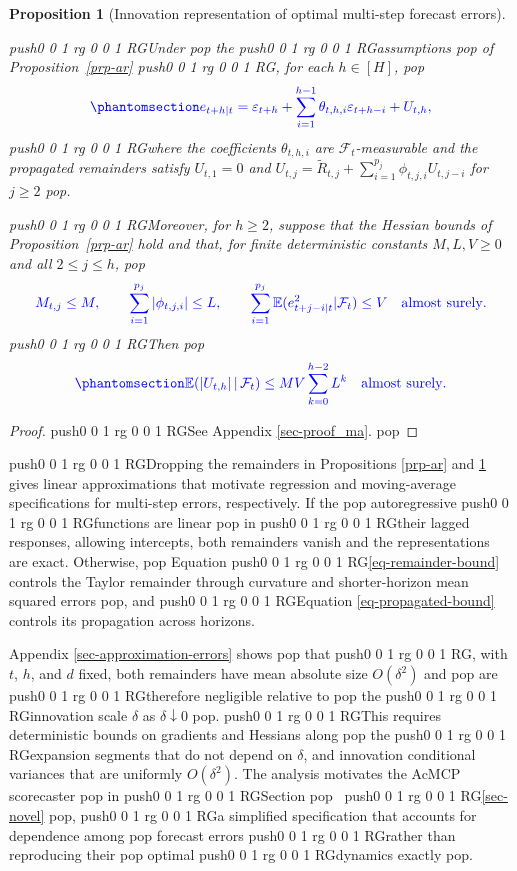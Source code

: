 \documentclass[
  american,
  12pt]{article}
\theoremstyle{plain}
\newtheorem{proposition}{Proposition}[section]
\theoremstyle{plain}
\theoremstyle{remark}
\newcommand{\CPTSadd}[1]{\ifmmode\else\leavevmode\fi\pdfcolorstack 0 push{0 0 1 rg 0 0 1 RG}#1\pdfcolorstack 0 pop}
\begin{document}
\begin{proposition}[Innovation representation of optimal multi-step
forecast errors]\protect\hypertarget{prp-ma}{}\label{prp-ma}

\CPTSadd{Under} the \CPTSadd{assumptions} of Proposition~\ref{prp-ar}\CPTSadd{, for each \(h\in[H]\),}
\begin{equation}\CPTSadd{\phantomsection\label{eq-ma}{
e_{t+h|t}=\varepsilon_{t+h}+
\sum_{i=1}^{h-1}\theta_{t,h,i}\varepsilon_{t+h-i}+U_{t,h},
}}\end{equation} \CPTSadd{where the coefficients \(\theta_{t,h,i}\) are
\(\mathcal F_t\)-measurable and the propagated remainders satisfy
\(U_{t,1}=0\) and
\(U_{t,j}=\widetilde R_{t,j}+\sum_{i=1}^{p_j}\phi_{t,j,i}U_{t,j-i}\) for
\(j\geq2\)}.

\CPTSadd{Moreover, for \(h\geq2\), suppose that the Hessian bounds of
Proposition~\ref{prp-ar} hold and that, for finite deterministic
constants \(M,L,V\geq0\) and all \(2\leq j\leq h\),} \[
\CPTSadd{M_{t,j}\leq M,\qquad
\sum_{i=1}^{p_j}|\phi_{t,j,i}|\leq L,
\qquad \sum_{i=1}^{p_j}\mathbb E(e_{t+j-i|t}^2|\mathcal F_t)\leq V\quad\text{almost surely}.}
\] \CPTSadd{Then} \begin{equation}\CPTSadd{\phantomsection\label{eq-propagated-bound}{
\mathbb E\!\left(|U_{t,h}|\,|\,\mathcal F_t\right)
\leq MV\sum_{k=0}^{h-2}L^k\quad\text{almost surely}.
}}\end{equation}

\end{proposition}

\begin{proof}
\CPTSadd{See Appendix \ref{sec-proof_ma}.}
\end{proof}

\CPTSadd{Dropping the remainders in Propositions \ref{prp-ar} and \ref{prp-ma}
gives linear approximations that motivate regression and moving-average
specifications for multi-step errors, respectively. If the}
autoregressive \CPTSadd{functions are linear} in \CPTSadd{their lagged responses, allowing
intercepts, both remainders vanish and the representations are exact.
Otherwise,} Equation \CPTSadd{\eqref{eq-remainder-bound} controls the Taylor
remainder through curvature and shorter-horizon mean squared errors}, and
\CPTSadd{Equation \eqref{eq-propagated-bound} controls its propagation across
horizons.

Appendix \ref{sec-approximation-errors} shows} that\CPTSadd{, with \(t\), \(h\),
and \(d\) fixed, both remainders have mean absolute size \(O(\delta^2)\)
and} are \CPTSadd{therefore negligible relative to} the \CPTSadd{innovation scale \(\delta\)
as \(\delta\downarrow0\)}. \CPTSadd{This requires deterministic bounds on
gradients and Hessians along} the \CPTSadd{expansion segments that do not depend
on \(\delta\), and innovation conditional variances that are uniformly
\(O(\delta^2)\). The analysis motivates the AcMCP scorecaster} in
\CPTSadd{Section}~\CPTSadd{\ref{sec-novel}}, \CPTSadd{a simplified specification that accounts for
dependence among} forecast errors \CPTSadd{rather than reproducing their} optimal
\CPTSadd{dynamics exactly}.
\end{document}
